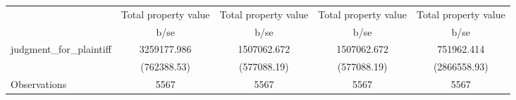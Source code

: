 {
\def\sym#1{\ifmmode^{#1}\else\(^{#1}\)\fi}
\begin{tabular}{l*{4}{c}}
\toprule
                    &\multicolumn{1}{c}{\hspace{0.25cm}Total property value}&\multicolumn{1}{c}{\hspace{0.25cm}Total property value}&\multicolumn{1}{c}{\hspace{0.25cm}Total property value}&\multicolumn{1}{c}{\hspace{0.25cm}Total property value}\\
                    &        b/se&        b/se&        b/se&        b/se\\
\midrule
judgment\_for\_plaintiff& 3259177.986& 1507062.672& 1507062.672&  751962.414\\
                    & (762388.53)& (577088.19)& (577088.19)&(2866558.93)\\
\midrule
Observations        &        5567&        5567&        5567&        5567\\
\bottomrule
\end{tabular}
}
